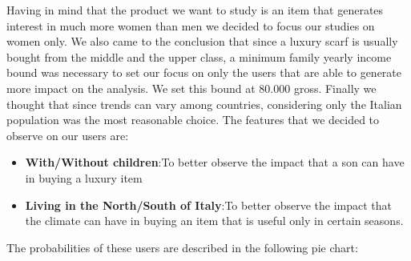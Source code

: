 Having in mind that the product we want to study is an item that generates interest in much more women than men we decided to focus our studies on women only. We also came to the conclusion that since a luxury scarf is usually bought from the middle and the upper class, a minimum family yearly income bound was necessary to set our focus on only the users that are able to generate more impact on the analysis. We set this bound at 80.000 \EUR{} gross. Finally we thought that since trends can vary among countries, considering only the Italian population was the most reasonable choice.
The features that we decided to observe on our users are:
\begin{itemize}
	\item \textbf{With/Without children}:\@ To better observe the impact that a son can have in buying a luxury item
	\item \textbf{Living in the North/South of Italy}:\@ To better observe the impact that the climate can have in buying an item that is useful only in certain seasons.
\end{itemize}
The probabilities of these users are described in the following pie chart:
